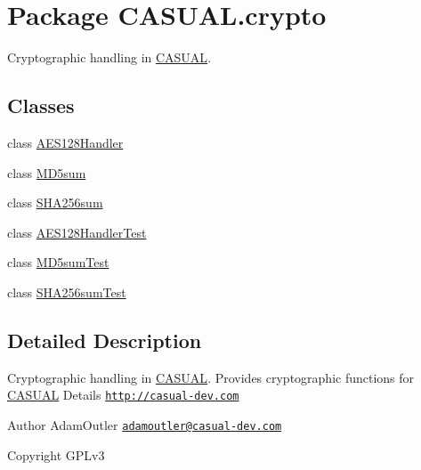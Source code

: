 \hypertarget{namespace_c_a_s_u_a_l_1_1crypto}{\section{Package C\-A\-S\-U\-A\-L.\-crypto}
\label{namespace_c_a_s_u_a_l_1_1crypto}
}


Cryptographic handling in \hyperlink{namespace_c_a_s_u_a_l}{C\-A\-S\-U\-A\-L}.  


\subsection*{Classes}
\begin{DoxyCompactItemize}
\item 
class \hyperlink{class_c_a_s_u_a_l_1_1crypto_1_1_a_e_s128_handler}{A\-E\-S128\-Handler}
\item 
class \hyperlink{class_c_a_s_u_a_l_1_1crypto_1_1_m_d5sum}{M\-D5sum}
\item 
class \hyperlink{class_c_a_s_u_a_l_1_1crypto_1_1_s_h_a256sum}{S\-H\-A256sum}
\item 
class \hyperlink{class_c_a_s_u_a_l_1_1crypto_1_1_a_e_s128_handler_test}{A\-E\-S128\-Handler\-Test}
\item 
class \hyperlink{class_c_a_s_u_a_l_1_1crypto_1_1_m_d5sum_test}{M\-D5sum\-Test}
\item 
class \hyperlink{class_c_a_s_u_a_l_1_1crypto_1_1_s_h_a256sum_test}{S\-H\-A256sum\-Test}
\end{DoxyCompactItemize}


\subsection{Detailed Description}
Cryptographic handling in \hyperlink{namespace_c_a_s_u_a_l}{C\-A\-S\-U\-A\-L}. Provides cryptographic functions for \hyperlink{namespace_c_a_s_u_a_l}{C\-A\-S\-U\-A\-L} Details \href{http://casual-dev.com}{\tt http\-://casual-\/dev.\-com} \begin{DoxyAuthor}{Author}
Adam\-Outler \href{mailto:adamoutler@casual-dev.com}{\tt adamoutler@casual-\/dev.\-com} 
\end{DoxyAuthor}
\begin{DoxyCopyright}{Copyright}
G\-P\-Lv3 
\end{DoxyCopyright}
